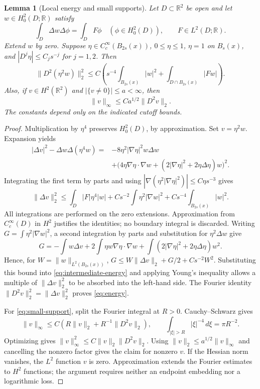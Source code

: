 \documentclass[11pt,twoside,leqno]{article}
\numberwithin{equation}{section}
\newtheorem{lemma}[theorem]{Lemma}
\theoremstyle{definition}
\theoremstyle{remark}
\newcommand{\R}{\mathbb R}
\begin{document}
\begin{lemma}[Local energy and small supports]\label{lem:energy}
Let $D\subset\R^2$ be open and let $w\in H^2_0(D;\R)$ satisfy
\[
 \int_D\Delta w\Delta\phi=\int_DF\phi
 \quad(\phi\in H^2_0(D)),\qquad F\in L^2(D;\R).
\]
Extend $w$ by zero. Suppose $\eta\in C_c^\infty(B_{2s}(x))$,
$0\le\eta\le1$, $\eta=1$ on $B_s(x)$, and
$|D^j\eta|\le C_js^{-j}$ for $j=1,2$. Then
\begin{equation}\label{eq:energy}
 \|D^2(\eta^2w)\|_2^2
 \le C\left(s^{-4}\int_{B_{2s}(x)}|w|^2
                  +\int_{D\cap B_{2s}(x)}|Fw|\right).
\end{equation}
Also, if $v\in H^2(\R^2)$ and $|\{v\ne0\}|\le a<\infty$, then
\begin{equation}\label{eq:small-support}
 \|v\|_\infty\le Ca^{1/2}\|D^2v\|_2.
\end{equation}
The constants depend only on the indicated cutoff bounds.
\end{lemma}
\begin{proof}
Multiplication by $\eta^4$ preserves $H^2_0(D)$, by approximation.
Set $v=\eta^2w$. Expansion yields
\begin{align*}
 |\Delta v|^2-\Delta w\Delta(\eta^4w)
 ={}&-8\eta^2|\nabla\eta|^2w\Delta w\\
 &+\bigl(4\eta\nabla\eta\cdot\nabla w
        +(2|\nabla\eta|^2+2\eta\Delta\eta)w\bigr)^2.
\end{align*}
Integrating the first term by parts and using
$|\nabla(\eta^2|\nabla\eta|^2)|\le C\eta s^{-3}$ gives
\begin{equation}\label{eq:intermediate-energy}
 \|\Delta v\|_2^2\le\int_D|F|\eta^4|w|
       +Cs^{-2}\int\eta^2|\nabla w|^2
       +Cs^{-4}\int_{B_{2s}(x)}|w|^2.
\end{equation}
All integrations are performed on the zero extensions. Approximation
from $C_c^\infty(D)$ in $H^2$ justifies the identities; no boundary
integral is discarded. Writing $G=\int\eta^2|\nabla w|^2$, a second integration
by parts and substitution for $\eta^2\Delta w$ give
\[
 G=-\int w\Delta v+2\int\eta w\nabla\eta\cdot\nabla w
   +\int(2|\nabla\eta|^2+2\eta\Delta\eta)w^2.
\]
Hence, for $W=\|w\|_{L^2(B_{2s}(x))}$,
$G\le W\|\Delta v\|_2+G/2+Cs^{-2}W^2$.
Substituting this bound into \eqref{eq:intermediate-energy} and applying
Young's inequality allows a multiple of $\|\Delta v\|_2^2$ to be
absorbed into the left-hand side.
The Fourier identity $\|D^2v\|_2^2=\|\Delta v\|_2^2$ proves
\eqref{eq:energy}.

For \eqref{eq:small-support}, split the Fourier integral at $R>0$.
Cauchy--Schwarz gives
\[
 \|v\|_\infty\le C(R\|v\|_2+R^{-1}\|D^2v\|_2),
 \qquad \int_{|\xi|>R}|\xi|^{-4}\,d\xi=\pi R^{-2}.
\]
Optimizing gives $\|v\|_\infty^2\le C\|v\|_2\|D^2v\|_2$.
Using $\|v\|_2\le a^{1/2}\|v\|_\infty$ and cancelling the nonzero
factor gives the claim for nonzero $v$. If the Hessian norm vanishes,
the $L^2$ function $v$ is zero. Approximation extends the Fourier
estimates to $H^2$ functions; the argument requires neither an endpoint
embedding nor a logarithmic loss.
\end{proof}
\end{document}
